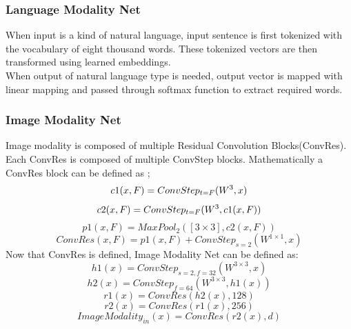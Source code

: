 \documentclass[12pt]{article}
\begin{document}
\subsubsection{Language Modality Net}
When input is a kind of natural language, input sentence is first tokenized with the vocabulary of eight thousand words. These tokenized vectors are then transformed using learned embeddings.\\
When output of natural language type is needed, output vector is mapped with linear mapping and passed through softmax function to extract required words.
\subsubsection{Image Modality Net}
Image modality is composed of multiple Residual Convolution Blocks(ConvRes). Each ConvRes is composed of multiple ConvStep blocks. Mathematically a ConvRes block can be defined as ;
\begin{equation}
c1(x,F) = ConvStep_{t=F}(W^{3 \time 3},x)
\end{equation}
\begin{equation}
c2(x,F) = ConvStep_{t=F}(W^{3 \time 3},c1(x,F))
\end{equation}
\begin{equation}
p1(x,F) = MaxPool_{2}([3 \times 3],c2(x,F))
\end{equation}
\begin{equation}
ConvRes(x,F) = p1(x,F) + ConvStep_{s=2}(W^{1 \times 1},x)
\end{equation}
Now that ConvRes is defined, Image Modality Net can be defined as:
\begin{equation}
h1(x) = ConvStep_{s = 2, f = 32}(W^{3 \times 3},x)
\end{equation}
\begin{equation}
h2(x) = ConvStep_{f = 64}(W^{3 \times 3},h1(x))
\end{equation}
\begin{equation}
r1(x) = ConvRes(h2(x),128)
\end{equation}
\begin{equation}
r2(x) = ConvRes(r1(x),256)
\end{equation}
\begin{equation}
ImageModality_{in}(x) = ConvRes(r2(x),d)
\end{equation}
\end{document}
